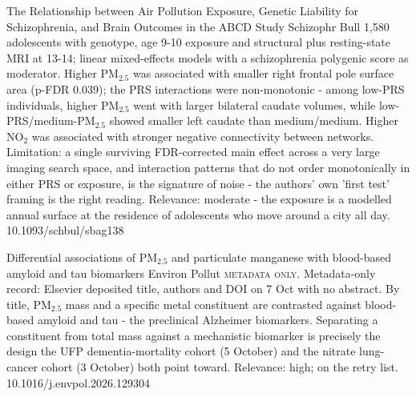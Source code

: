 \documentclass[10pt]{article}
\begin{document}
{The Relationship between Air Pollution Exposure, Genetic Liability for Schizophrenia, and Brain Outcomes in the ABCD Study}
{Schizophr Bull}
{1,580 adolescents with genotype, age 9-10 exposure and structural plus resting-state MRI at 13-14; linear mixed-effects models with a schizophrenia polygenic score as moderator. Higher PM$_{2.5}$ was associated with smaller right frontal pole surface area (p-FDR 0.039); the PRS interactions were non-monotonic - among low-PRS individuals, higher PM$_{2.5}$ went with larger bilateral caudate volumes, while low-PRS/medium-PM$_{2.5}$ showed smaller left caudate than medium/medium. Higher NO$_2$ was associated with stronger negative connectivity between networks. Limitation: a single surviving FDR-corrected main effect across a very large imaging search space, and interaction patterns that do not order monotonically in either PRS or exposure, is the signature of noise - the authors' own 'first test' framing is the right reading. Relevance: moderate - the exposure is a modelled annual surface at the residence of adolescents who move around a city all day.}
{10.1093/schbul/sbag138}

{Differential associations of PM$_{2.5}$ and particulate manganese with blood-based amyloid and tau biomarkers}
{Environ Pollut}
{\textsc{metadata only.} Metadata-only record: Elsevier deposited title, authors and DOI on 7 Oct with no abstract. By title, PM$_{2.5}$ mass and a specific metal constituent are contrasted against blood-based amyloid and tau - the preclinical Alzheimer biomarkers. Separating a constituent from total mass against a mechanistic biomarker is precisely the design the UFP dementia-mortality cohort (5 October) and the nitrate lung-cancer cohort (3 October) both point toward. Relevance: high; on the retry list.}
{10.1016/j.envpol.2026.129304}

\par{}\baselineskip{}\baselineskip
{}
\end{document}
